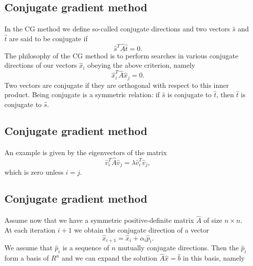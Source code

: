 \documentclass[%
twoside,                 %
final,                   %
10pt]{article}
\begin{document}
\subsection*{Conjugate gradient method}

\paragraph{}
In the CG method we define so-called conjugate directions and two vectors 
$\hat{s}$ and $\hat{t}$
are said to be
conjugate if
\begin{equation*}
\hat{s}^T\hat{A}\hat{t}= 0.
\end{equation*}
The philosophy of the CG method is to perform searches in various conjugate directions
of our vectors $\hat{x}_i$ obeying the above criterion, namely
\begin{equation*}
\hat{x}_i^T\hat{A}\hat{x}_j= 0.
\end{equation*}
Two vectors are conjugate if they are orthogonal with respect to 
this inner product. Being conjugate is a symmetric relation: if $\hat{s}$ is conjugate to $\hat{t}$, then $\hat{t}$ is conjugate to $\hat{s}$.



\subsection*{Conjugate gradient method}

\paragraph{}
An example is given by the eigenvectors of the matrix
\begin{equation*}
\hat{v}_i^T\hat{A}\hat{v}_j= \lambda\hat{v}_i^T\hat{v}_j,
\end{equation*}
which is zero unless $i=j$.




\subsection*{Conjugate gradient method}

\paragraph{}
Assume now that we have a symmetric positive-definite matrix $\hat{A}$ of size
$n\times n$. At each iteration $i+1$ we obtain the conjugate direction of a vector
\begin{equation*}
\hat{x}_{i+1}=\hat{x}_{i}+\alpha_i\hat{p}_{i}. 
\end{equation*}
We assume that $\hat{p}_{i}$ is a sequence of $n$ mutually conjugate directions. 
Then the $\hat{p}_{i}$  form a basis of $R^n$ and we can expand the solution 
$  \hat{A}\hat{x} = \hat{b}$ in this basis, namely
\end{document}
